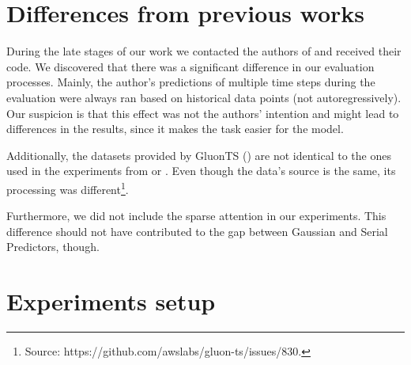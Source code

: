 \documentclass[en]{pracamgr}
\begin{document}
%



\section{Differences from previous works}\label{s:diff}

During the late stages of our work we contacted the authors of \cite{enhancing} and received their code. We discovered that there was a significant difference in our evaluation processes. 
Mainly, the author's predictions of multiple time steps during the evaluation were always ran based on historical data points (not autoregressively). Our suspicion is that this effect was not the authors' intention and might lead to differences in the results, since it makes the task easier for the model.

Additionally, the datasets provided by GluonTS (\cite{gluonts}) are not identical to the ones used in the experiments from \cite{enhancing} or \cite{deepar}. Even though the data's source is the same, its processing was different\footnote{Source: https://github.com/awslabs/gluon-ts/issues/830.}.

Furthermore, we did not include the sparse attention in our experiments. 
 This difference should not have contributed to the gap between Gaussian and Serial Predictors, though. 


\section{Experiments setup}
\end{document}
